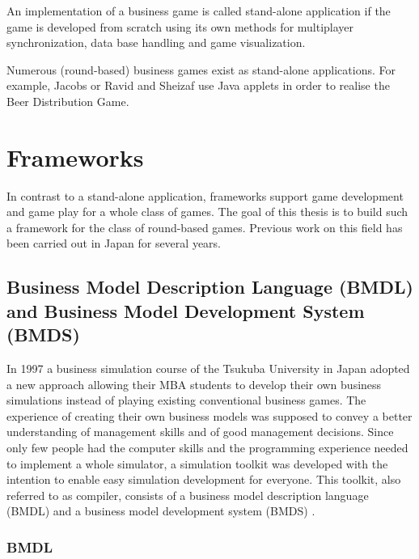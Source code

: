 An implementation of a business game is called stand-alone application if the game is developed from scratch using its own methods for multiplayer synchronization, data base handling and game visualization.

Numerous (round-based) business games exist as stand-alone applications. For example, Jacobs \cite{sa2} or Ravid and Sheizaf \cite{sa1} use Java applets in order to realise the Beer Distribution Game. 


\section{Frameworks}
\label{sec:framework}

In contrast to a stand-alone application, frameworks support game development and game play for a whole class of games. The goal of this thesis is to build such a framework for the class of round-based games. Previous work on this field has been carried out in Japan for several years.

\subsection{Business Model Description Language (BMDL) and Business Model Development System (BMDS)}
\label{subsec:bmdl}

In 1997 a business simulation course of the Tsukuba University in Japan adopted a new approach allowing their MBA students to develop their own business simulations instead of playing existing conventional business games. The experience of creating their own business models was supposed to convey a better understanding of management skills and of good management decisions. Since only few people had the computer skills and the programming experience needed to implement a whole simulator, a simulation toolkit was developed with the intention to enable easy simulation development for everyone. This toolkit, also referred to as compiler, consists of a business model description language (BMDL) and a business model development system (BMDS) \cite{bmdl3, bmdl2, bmdl1}.

\subsubsection{BMDL}
\label{subsub:bmdl}

